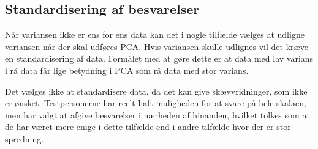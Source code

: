 \subsection{Standardisering af besvarelser}
Når variansen ikke er ens for ens data kan det i nogle tilfælde vælges at udligne variansen når der skal udføres PCA. Hvis variansen skulle udlignes vil det kræve en standardisering af data. Formålet med at gøre dette er at data med lav varians i rå data får lige betydning i PCA som rå data med stor varians. 

Det vælges ikke at standardisere data, da det kan give skævvridninger, som ikke er ønsket. Testpersonerne har reelt haft muligheden for at svare på hele skalaen, men har valgt at afgive besvarelser i nærheden af hinanden, hvilket tolkes som at de har været mere enige i dette tilfælde end i andre tilfælde hvor der er stor spredning.
\newpage

%
